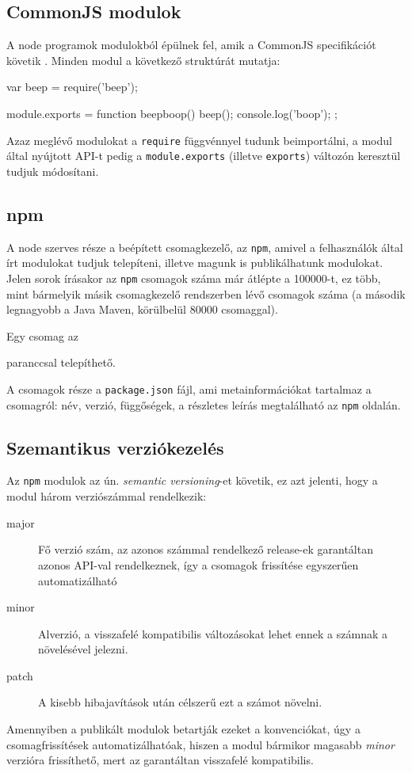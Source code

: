 \subsection{CommonJS modulok}

A node programok modulokból épülnek fel, amik a CommonJS specifikációt követik
\cite{CommonJS}.
Minden modul a következő struktúrát mutatja:

\begin{js}
var beep = require('beep');

module.exports = function beepboop() {
  beep();
  console.log('boop');
};
\end{js}

Azaz meglévő modulokat a \verb=require= függvénnyel tudunk beimportálni,
a modul által nyújtott API-t pedig a \verb=module.exports=
(illetve \verb=exports=) változón keresztül tudjuk módosítani.

\subsection{npm}

A node szerves része a beépített csomagkezelő, az \verb=npm=, amivel a
felhasználók által írt modulokat tudjuk telepíteni, illetve magunk is
publikálhatunk modulokat. Jelen sorok írásakor az \verb=npm= csomagok száma
már átlépte a 100000-t\cite{NPM-100K},
ez több, mint bármelyik másik csomagkezelő rendszerben lévő csomagok száma
(a második legnagyobb a Java Maven, körülbelül 80000 csomaggal).

Egy csomag az


paranccsal telepíthető.

A csomagok része a \verb=package.json= fájl, ami metainformációkat tartalmaz a
csomagról: név, verzió, függőségek, a részletes leírás megtalálható az
\verb=npm= oldalán\cite{Package-JSON}.

\subsection{Szemantikus verziókezelés}

Az \verb=npm= modulok az ún. \emph{semantic versioning}-et követik\cite{Semver},
ez azt jelenti, hogy a modul három verziószámmal rendelkezik:

\begin{description}
\item[major] Fő verzió szám, az azonos számmal rendelkező release-ek garantáltan
azonos API-val rendelkeznek, így a csomagok frissítése egyszerűen
automatizálható
\item[minor] Alverzió, a visszafelé kompatibilis változásokat lehet ennek a
számnak a növelésével jelezni.
\item[patch] A kisebb hibajavítások után célszerű ezt a számot növelni.
\end{description}

Amennyiben a publikált modulok betartják ezeket a konvenciókat, úgy
a csomagfrissítések automatizálhatóak, hiszen a modul bármikor magasabb
\emph{minor} verzióra frissíthető, mert az garantáltan visszafelé kompatibilis.
